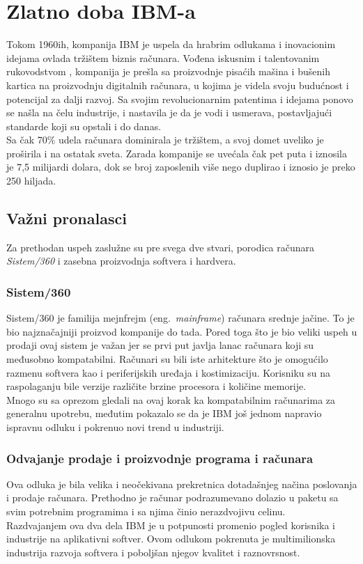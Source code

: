 \documentclass[a4paper]{article}
\begin{document}
\section{Zlatno doba IBM-a}%
Tokom 1960ih, kompanija IBM je uspela da hrabrim odlukama i inovacionim idejama ovlada tržištem biznis računara. Vođena iskusnim i talentovanim rukovodstvom%
, kompanija je prešla sa proizvodnje pisaćih mašina i bušenih kartica na proizvodnju digitalnih računara, u kojima je videla svoju budućnost i potencijal za dalji razvoj.
Sa svojim revolucionarnim patentima i idejama ponovo se našla na čelu industrije, i nastavila je da je vodi i usmerava, postavljajući standarde koji su opstali i do danas.\\
Sa čak 70\% udela računara dominirala je tržištem, %
a svoj domet uveliko je proširila i na ostatak sveta. Zarada kompanije se uvećala čak pet puta i iznosila je 7,5 milijardi dolara, dok se broj zaposlenih više nego duplirao i iznosio je preko 250 hiljada. %
\subsection{Važni pronalasci} 
Za prethodan uspeh zaslužne su pre svega dve stvari, porodica računara \emph{Sistem/360}  i zasebna proizvodnja softvera i hardvera.
\subsubsection*{Sistem/360}Sistem/360 je familija mejnfrejm (eng.~{\em mainframe}) računara srednje jačine. To je bio najznačajniji proizvod kompanije do tada. Pored toga što je bio veliki uspeh u prodaji ovaj sistem je važan jer se prvi put javlja lanac računara koji su međusobno kompatabilni.
Računari su bili iste arhitekture što je omogućilo razmenu softvera kao i periferijskih uređaja i kostimizaciju. Korisniku su na raspolaganju bile verzije različite brzine procesora i količine memorije. \\%
Mnogo su sa oprezom gledali na ovaj korak ka kompatabilnim računarima za generalnu upotrebu, međutim pokazalo se da je IBM još jednom napravio ispravnu odluku i pokrenuo novi trend u industriji.%
\subsubsection*{Odvajanje prodaje i proizvodnje programa i računara} Ova odluka je bila velika i neočekivana prekretnica dotadašnjeg načina poslovanja i prodaje računara. Prethodno je računar podrazumevano dolazio u paketu sa svim potrebnim programima i sa njima činio nerazdvojivu celinu.\\
Razdvajanjem ova dva dela IBM je u potpunosti promenio pogled korisnika i industrije na aplikativni softver. Ovom odlukom pokrenuta je multimilionska industrija razvoja softvera i poboljšan njegov kvalitet i raznovrsnost. 
\end{document}
